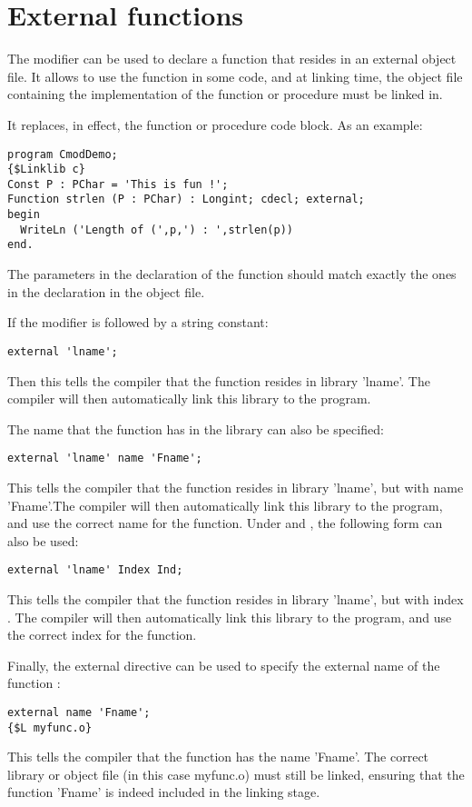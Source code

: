 \section{External functions}
\label{se:external}
The  modifier can be used to declare a function that resides in
an external object file. It allows to use the function in some code, and at
linking time, the object file containing the implementation of the function
or procedure must be linked in.

It replaces, in effect, the function or procedure code block.
As an example:
\begin{verbatim}
program CmodDemo;
{$Linklib c}
Const P : PChar = 'This is fun !';
Function strlen (P : PChar) : Longint; cdecl; external;
begin
  WriteLn ('Length of (',p,') : ',strlen(p))
end.
\end{verbatim}
\begin{remark}
The parameters in the declaration of the  function
should match exactly the ones in the declaration in the object file.
\end{remark}
If the  modifier is followed by a string constant:
\begin{verbatim}
external 'lname';
\end{verbatim}
Then this tells the compiler that the function resides in library
'lname'. The compiler will then automatically link this library to
the program.

The name that the function has in the library can also be specified:
\begin{verbatim}
external 'lname' name 'Fname';
\end{verbatim}
This tells the compiler that the function resides in library 'lname',
but with name 'Fname'.The compiler will then automatically link this
library to the program, and use the correct name for the function.
Under \windows and \ostwo, the following form can also be used:
\begin{verbatim}
external 'lname' Index Ind;
\end{verbatim}
This tells the compiler that the function resides in library 'lname',
but with index . The compiler will then automatically
link this library to the program, and use the correct index for the
function.

Finally, the external directive can be used to specify the external name
of the function :
\begin{verbatim}
external name 'Fname';
{$L myfunc.o}
\end{verbatim}
%
This tells the compiler that the function has the name 'Fname'. The
correct library or object file (in this case myfunc.o) must still be linked,
ensuring that the function 'Fname' is indeed included in the linking stage.

